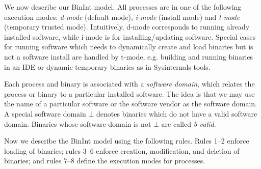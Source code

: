 We now describe our BinInt model.
All processes are in one of the following execution modes:
{\em d-mode} (default mode), {\em i-mode} (install mode) and
{\em t-mode} (temporary trusted mode).
Intuitively, d-mode corresponds to running already installed software,
while i-mode is for installing/updating software.
Special cases for running software
which needs to dynamically create and load binaries but is not a software
install are handled by t-mode,
e.g. building and running binaries in an IDE
or dynamic temporary binaries as in Sysinternals tools.

Each process and binary is associated with a {\em software domain}, which
relates the process or binary to a particular installed software.
The idea is that we may use the name of a particular software or
the software vendor as the software domain.
A special software domain $\bot$ denotes binaries
which do not have a valid software domain.
Binaries whose software domain is not $\bot$ are called {\em b-valid}.

Now we describe the BinInt model using the following rules.
Rules 1--2 enforce loading of binaries;
rules 3--6 enforce creation, modification, and deletion of binaries;
and rules 7--8 define the execution modes for processes.

